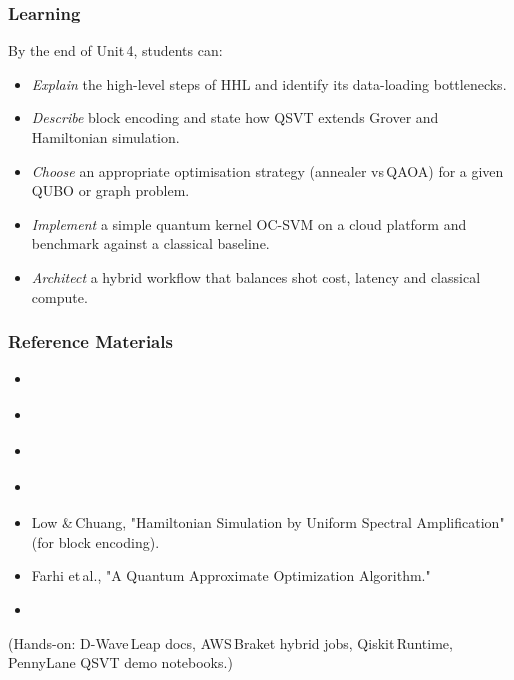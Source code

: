 \subsubsection{Learning}

By the end of Unit\,4, students can:
\begin{itemize}
	\item \emph{Explain} the high-level steps of HHL and identify its data-loading bottlenecks.
	
	\item \emph{Describe} block encoding and state how QSVT extends Grover and Hamiltonian simulation.
	
	\item \emph{Choose} an appropriate optimisation strategy (annealer vs\,QAOA) for a given QUBO or graph problem.
	
	\item \emph{Implement} a simple quantum kernel OC-SVM on a cloud platform and benchmark against a classical baseline.
	
	\item \emph{Architect} a hybrid workflow that balances shot cost, latency and classical compute.
\end{itemize}

\subsubsection{Reference Materials}
\begin{itemize}
	\item \citeauthor{Lipton:2021} 
	\item \citeauthor{Harrow:2009} 
	\item \citeauthor{Abhijith:2022} 
	\item \citeauthor{Dalzell:2023} 
	\item Low \&\,Chuang, "Hamiltonian Simulation by Uniform Spectral Amplification" (for block encoding).
	\item Farhi et\,al., "A Quantum Approximate Optimization Algorithm."
	\item \citeauthor{Havlicek:2019} 
\end{itemize}

(Hands-on: D-Wave\,Leap docs, AWS\,Braket hybrid jobs, Qiskit\,Runtime, PennyLane QSVT demo notebooks.)

